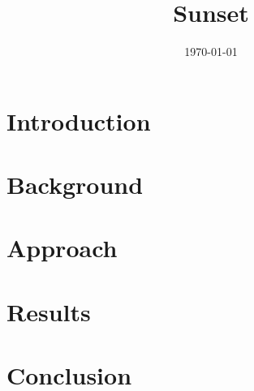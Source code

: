 \documentclass[11pt]{article}
\title{Sunset}
\author{}
\date{\today}
\begin{document}
\maketitle

\section{Introduction}

\section{Background}

\section{Approach}

\section{Results}

\section{Conclusion}
\end{document}
